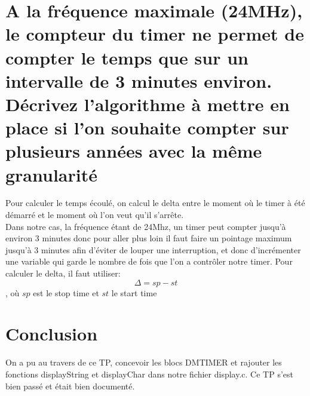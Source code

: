 \section{A la fréquence maximale (24MHz), le compteur du timer ne permet de compter le temps que sur un intervalle de 3 minutes environ. Décrivez l'algorithme à mettre en place si l'on souhaite compter sur plusieurs années avec la même granularité}
Pour calculer le temps écoulé, on calcul le delta entre le moment où le timer à été démarré et le moment où l'on veut qu'il s'arrête.\\
Dans notre cas, la fréquence étant de 24Mhz, un timer peut compter jusqu'à environ 3 minutes donc pour aller plus loin il faut faire un pointage maximum jusqu'à 3 minutes afin d'éviter de louper une interruption, et donc d'incrémenter une variable qui garde le nombre de fois que l'on a contrôler notre timer.
Pour calculer le delta, il faut utiliser: $$\Delta = sp - st$$, où $sp$ est le stop time et $st$ le start time

\section{Conclusion}

On a pu au travers de ce TP, concevoir les blocs DMTIMER et rajouter les fonctions displayString et displayChar dans notre fichier display.c. Ce TP s'est bien passé et était bien documenté.


